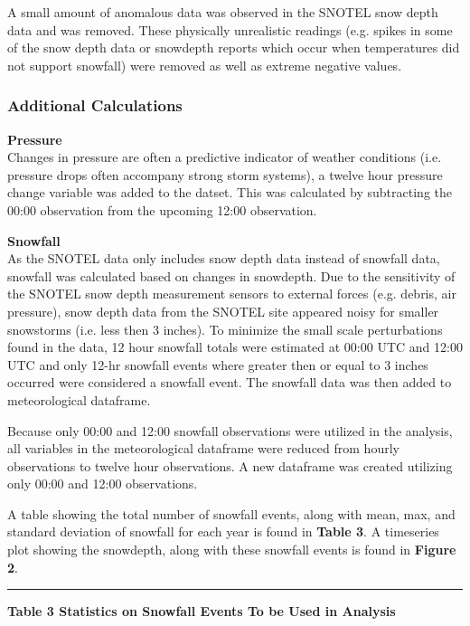 \documentclass[11pt]{article}
\begin{document}
A small amount of anomalous data was observed in the SNOTEL snow depth
data and was removed. These physically unrealistic readings (e.g. spikes
in some of the snow depth data or snowdepth reports which occur when
temperatures did not support snowfall) were removed as well as extreme
negative values.

\subsubsection{Additional Calculations}\label{additional-calculations}

\textbf{Pressure}\\
Changes in pressure are often a predictive indicator of weather
conditions (i.e. pressure drops often accompany strong storm systems), a
twelve hour pressure change variable was added to the datset. This was
calculated by subtracting the 00:00 observation from the upcoming 12:00
observation.

\textbf{Snowfall}\\
As the SNOTEL data only includes snow depth data instead of snowfall
data, snowfall was calculated based on changes in snowdepth. Due to the
sensitivity of the SNOTEL snow depth measurement sensors to external
forces (e.g. debris, air pressure), snow depth data from the SNOTEL site
appeared noisy for smaller snowstorms (i.e. less then 3 inches). To
minimize the small scale perturbations found in the data, 12 hour
snowfall totals were estimated at 00:00 UTC and 12:00 UTC and only 12-hr
snowfall events where greater then or equal to 3 inches occurred were
considered a snowfall event. The snowfall data was then added to
meteorological dataframe.

Because only 00:00 and 12:00 snowfall observations were utilized in the
analysis, all variables in the meteorological dataframe were reduced
from hourly observations to twelve hour observations. A new dataframe
was created utilizing only 00:00 and 12:00 observations.

A table showing the total number of snowfall events, along with mean,
max, and standard deviation of snowfall for each year is found in
\textbf{Table 3}. A timeseries plot showing the snowdepth, along with
these snowfall events is found in \textbf{Figure 2}.

\begin{center}\rule{0.5\linewidth}{\linethickness}\end{center}

\textbf{Table 3 Statistics on Snowfall Events To be Used in Analysis}
\end{document}
